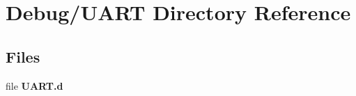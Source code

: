 \section{Debug/\+U\+A\+R\+T Directory Reference}
\label{dir_e153299b20d9f46c1fdbed93a4947a78}
\subsection*{Files}
\begin{DoxyCompactItemize}
\item 
file {\bfseries U\+A\+R\+T.\+d}
\end{DoxyCompactItemize}
